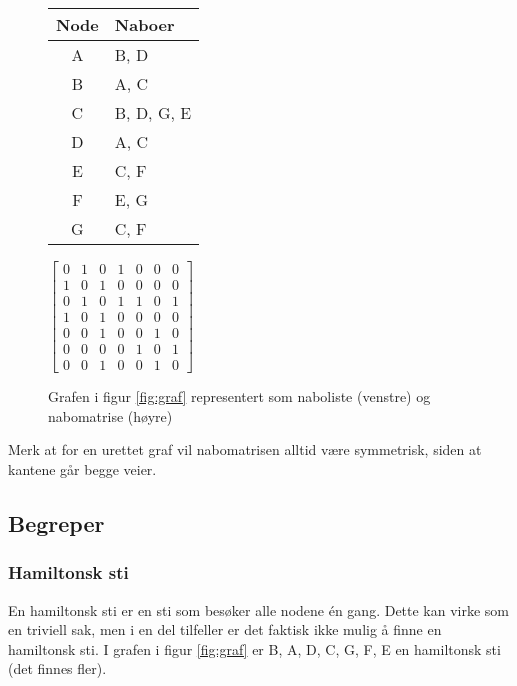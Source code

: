 \begin{figure}[H]
\centering
\caption{Grafen i figur \ref{fig:graf} representert som naboliste (venstre) og nabomatrise (høyre)}
\begin{tabular}{c | l}
Node & Naboer \\ \hline
A & B, D \\
B & A, C \\
C & B, D, G, E \\
D & A, C \\
E & C, F \\
F & E, G \\
G & C, F
\end{tabular}\quad\quad\quad
$ \begin{bmatrix}
0 & 1 & 0 & 1 & 0 & 0 & 0 \\
1 & 0 & 1 & 0 & 0 & 0 & 0 \\
0 & 1 & 0 & 1 & 1 & 0 & 1 \\
1 & 0 & 1 & 0 & 0 & 0 & 0 \\
0 & 0 & 1 & 0 & 0 & 1 & 0 \\
0 & 0 & 0 & 0 & 1 & 0 & 1 \\
0 & 0 & 1 & 0 & 0 & 1 & 0 
\end{bmatrix} $
\end{figure}
Merk at for en urettet graf vil nabomatrisen alltid være symmetrisk, siden at kantene går begge veier. 


\subsection{Begreper}
\vspace{-40pt}
\subsubsection{Hamiltonsk sti}
En hamiltonsk sti er en sti som besøker alle nodene én gang. Dette kan virke som en triviell sak, men i en del tilfeller er det faktisk ikke mulig å finne en hamiltonsk sti. I grafen i figur \ref{fig:graf} er B, A, D, C, G, F, E en hamiltonsk sti (det finnes fler). 


%
%



